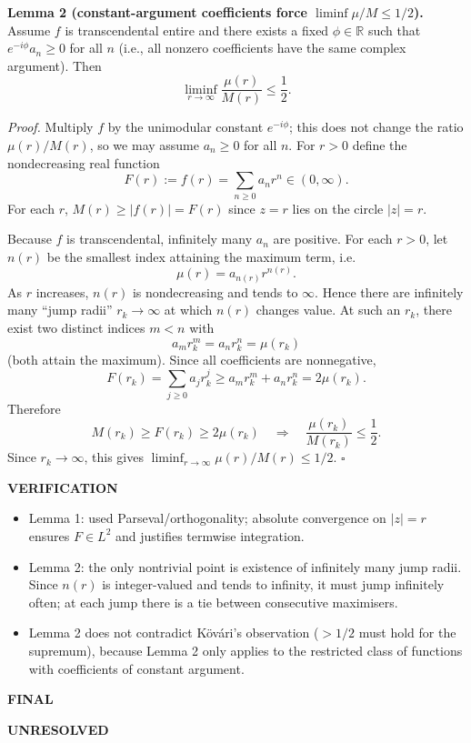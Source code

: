 \medskip
\noindent\textbf{Lemma 2 (constant-argument coefficients force $\liminf \mu/M\le 1/2$).}
Assume $f$ is transcendental entire and there exists a fixed $\phi\in\mathbb{R}$ such that $e^{-i\phi} a_n\ge 0$ for all $n$ (i.e., all nonzero coefficients have the same complex argument). Then
\[
\liminf_{r\to\infty} \frac{\mu(r)}{M(r)}\le \frac12.
\]

\textit{Proof.}
Multiply $f$ by the unimodular constant $e^{-i\phi}$; this does not change the ratio $\mu(r)/M(r)$, so we may assume $a_n\ge 0$ for all $n$.
For $r>0$ define the nondecreasing real function
\[
F(r):=f(r)=\sum_{n\ge 0} a_n r^n\in(0,\infty).
\]
For each $r$, $M(r)\ge |f(r)|=F(r)$ since $z=r$ lies on the circle $|z|=r$.

Because $f$ is transcendental, infinitely many $a_n$ are positive. For each $r>0$, let $n(r)$ be the smallest index attaining the maximum term, i.e.
\[
\mu(r)=a_{n(r)} r^{n(r)}.
\]
As $r$ increases, $n(r)$ is nondecreasing and tends to $\infty$. Hence there are infinitely many ``jump radii'' $r_k\to\infty$ at which $n(r)$ changes value.
At such an $r_k$, there exist two distinct indices $m< n$ with
\[
a_m r_k^m = a_n r_k^n = \mu(r_k)
\]
(both attain the maximum). Since all coefficients are nonnegative,
\[
F(r_k)=\sum_{j\ge 0} a_j r_k^j \ge a_m r_k^m + a_n r_k^n = 2\mu(r_k).
\]
Therefore
\[
M(r_k)\ge F(r_k)\ge 2\mu(r_k)
\quad\Longrightarrow\quad
\frac{\mu(r_k)}{M(r_k)}\le \frac12.
\]
Since $r_k\to\infty$, this gives $\liminf_{r\to\infty} \mu(r)/M(r)\le 1/2$.
\hfill$\square$

\medskip
\noindent\textbf{VERIFICATION}

\begin{itemize}
\item Lemma 1: used Parseval/orthogonality; absolute convergence on $|z|=r$ ensures $F\in L^2$ and justifies termwise integration.
\item Lemma 2: the only nontrivial point is existence of infinitely many jump radii. Since $n(r)$ is integer-valued and tends to infinity, it must jump infinitely often; at each jump there is a tie between consecutive maximisers.
\item Lemma 2 does not contradict K\"ov\'ari's observation ($>1/2$ must hold for the supremum), because Lemma 2 only applies to the restricted class of functions with coefficients of constant argument.
\end{itemize}

\medskip
\noindent\textbf{FINAL}

\textbf{UNRESOLVED}

